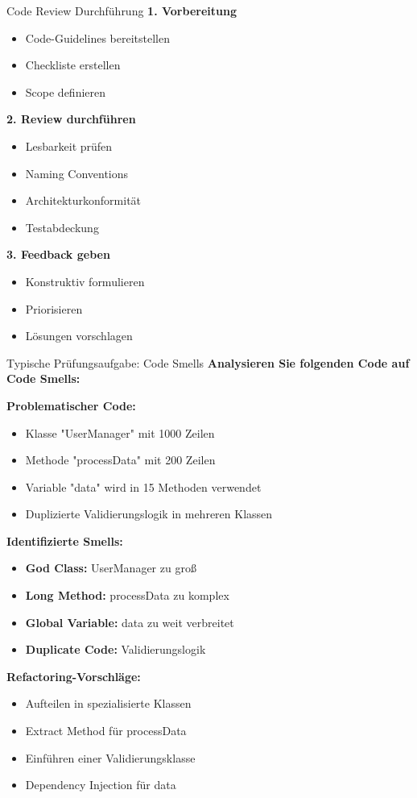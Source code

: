 \begin{KR}{Code Review Durchführung}
\textbf{1. Vorbereitung}
\begin{itemize}
    \item Code-Guidelines bereitstellen
    \item Checkliste erstellen
    \item Scope definieren
\end{itemize}

\textbf{2. Review durchführen}
\begin{itemize}
    \item Lesbarkeit prüfen
    \item Naming Conventions
    \item Architekturkonformität
    \item Testabdeckung
\end{itemize}

\textbf{3. Feedback geben}
\begin{itemize}
    \item Konstruktiv formulieren
    \item Priorisieren
    \item Lösungen vorschlagen
\end{itemize}
\end{KR}

\begin{example}{Typische Prüfungsaufgabe: Code Smells}
\textbf{Analysieren Sie folgenden Code auf Code Smells:}

\textbf{Problematischer Code:}
\begin{itemize}
    \item Klasse "UserManager" mit 1000 Zeilen
    \item Methode "processData" mit 200 Zeilen
    \item Variable "data" wird in 15 Methoden verwendet
    \item Duplizierte Validierungslogik in mehreren Klassen
\end{itemize}

\textbf{Identifizierte Smells:}
\begin{itemize}
    \item \textbf{God Class:} UserManager zu groß
    \item \textbf{Long Method:} processData zu komplex
    \item \textbf{Global Variable:} data zu weit verbreitet
    \item \textbf{Duplicate Code:} Validierungslogik
\end{itemize}

\textbf{Refactoring-Vorschläge:}
\begin{itemize}
    \item Aufteilen in spezialisierte Klassen
    \item Extract Method für processData
    \item Einführen einer Validierungsklasse
    \item Dependency Injection für data
\end{itemize}
\end{example}

